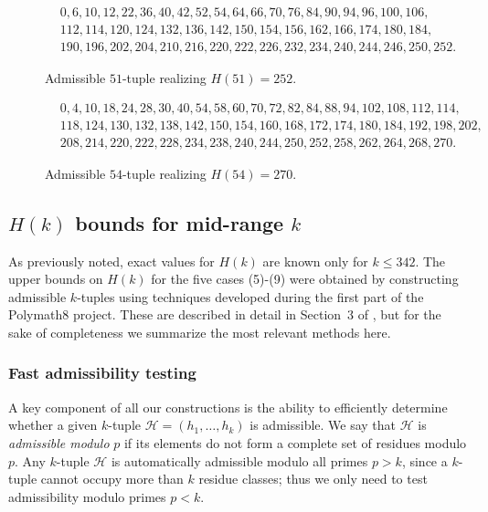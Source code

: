 \documentclass{bmcart}
\theoremstyle{plain}
\theoremstyle{definition}
\begin{document}
\begin{figure}
\begin{align*}
&0,6,10,12,22,36,40,42,52,54,64,66,70,76,84,90,94,96,100,106,\\
&112,114,120,124,132,136,142,150,154,156,162,166,174,180,184,\\
&190,196,202,204,210,216,220,222,226,232,234,240,244,246,250,252.
\end{align*}
\caption{Admissible $51$-tuple realizing $H(51)=252$.}\label{k51tup}
\end{figure}
\begin{figure}

\begin{align*}
&0,4,10,18,24,28,30,40,54,58,60,70,72,82,84,88,94,102,108,112,114,\\
&118,124,130,132,138,142,150,154,160,168,172,174,180,184,192,198,202,\\
&208,214,220,222,228,234,238,240,244,250,252,258,262,264,268,270.
\end{align*}
\caption{Admissible $54$-tuple realizing $H(54)=270$.}\label{k54tup}
\end{figure}

\subsection{\texorpdfstring{$H(k)$}{H(k)} bounds for mid-range \texorpdfstring{$k$}{k}}\label{secmidk}

As previously noted, exact values for $H(k)$ are known only for $k\le 342$.
The upper bounds on $H(k)$ for the five cases (5)-(9) were obtained by constructing admissible $k$-tuples using techniques developed during the first part of the Polymath8 project.
These are described in detail in Section~3 of \cite{polymath8a-unabridged}, but for the sake of completeness we summarize the most relevant methods here.

\subsubsection{Fast admissibility testing}
A key component of all our constructions is the ability to efficiently determine whether a given $k$-tuple $\mathcal{H}=(h_1,\ldots, h_k)$ is admissible.  We say that $\mathcal{H}$ is \emph{admissible modulo} $p$ if its elements do not form a complete set of residues modulo $p$.
Any $k$-tuple $\mathcal{H}$ is automatically admissible modulo all primes $p > k$, since a $k$-tuple cannot occupy more than $k$ residue classes; thus we only need to test admissibility modulo primes $p < k$.
\end{document}
